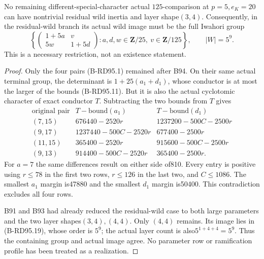\begin{theorem}
\label{thm:B-RD95-tracefree}
No remaining different-special-character actual $125$-comparison
at $p=5,e_K=20$ can have nontrivial residual wild inertia and layer
shape$(3,4)$. Consequently, in the residual-wild branch its actual
wild image must be the full Iwahori group
\[
 \left\{\begin{pmatrix}1+5a&v\\5w&1+5d\end{pmatrix}:
 a,d,w\in\mathbf Z/25,\ v\in\mathbf Z/125\right\},
 \qquad |W|=5^9.                                    \tag{B-RD95.19}
\]
This is a necessary restriction, not an existence statement.
\end{theorem}
\begin{proof}
Only the four pairs (B-RD95.1) remained after B94. On their same
actual terminal group, the determinant is
$1+25(a_1+d_1)$, whose conductor is at most the larger of the
bounds (B-RD95.11). But it is also the actual cyclotomic character
of exact conductor $T$. Subtracting the two bounds from $T$ gives
\[
\begin{array}{c|r|r}
 \text{original pair}&T-\text{bound}(a_1)&T-\text{bound}(d_1)\\\hline
 (7,15)&676440-2520r&1237200-500C-2500r\\
 (9,17)&1237440-500C-2520r&677400-2500r\\
 (11,15)&365400-2520r&915600-500C-2500r\\
 (9,13)&914400-500C-2520r&365400-2500r.
\end{array}                                           \tag{B-RD95.20}
\]
For $a=7$ the same differences result on either side of810.
Every entry is positive using $r\le78$ in the first two rows,
$r\le126$ in the last two, and $C\le1086$. The smallest
$a_1$ margin is47880 and the smallest $d_1$ margin is50400.
This contradiction excludes all four rows.

B91 and B93 had already reduced the residual-wild case to both
large parameters and the two layer shapes$(3,4),(4,4)$. Only
$(4,4)$ remains. Its image lies in (B-RD95.19), whose order is
$5^9$; the actual layer count is also$5^{1+4+4}=5^9$. Thus the
containing group and actual image agree. No parameter row or
ramification profile has been treated as a realization.
\end{proof}

